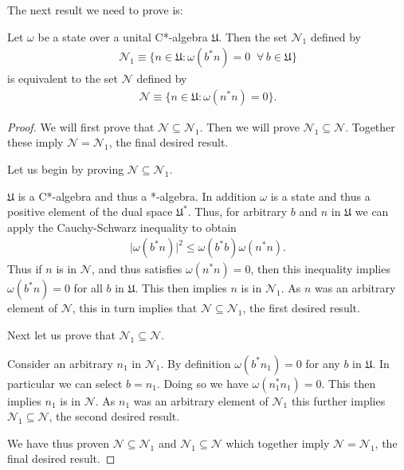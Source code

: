 The next result we need to prove is:

\begin{lemma}
    \label{lmm:lmm1}
    \leanok
    Let $\omega$ be a state over a unital C*-algebra $\mathfrak{U}$. Then the set $\mathcal{N}_1$ defined by
    \begin{align}
        \mathcal{N}_1 \equiv \{ n \in \mathfrak{U} : \omega(b^*n) = 0 \;\; \forall \, b \in \mathfrak{U} \}
    \end{align}
    is equivalent to the set $\mathcal{N}$ defined by
    \begin{align}
        \mathcal{N} \equiv \{ n \in \mathfrak{U} : \omega(n^*n) = 0 \}.
    \end{align}
\end{lemma}
\begin{proof}
We will first prove that $\mathcal{N} \subseteq \mathcal{N}_1$. Then we will prove $\mathcal{N}_1 \subseteq \mathcal{N}$. Together these imply $\mathcal{N} = \mathcal{N}_1$, the final desired result.

Let us begin by proving $\mathcal{N} \subseteq \mathcal{N}_1$.

$\mathfrak{U}$ is a C*-algebra and thus a *-algebra. In addition $\omega$ is a state and thus a positive element of the dual space $\mathfrak{U}^*$. Thus, for arbitrary $b$ and $n$ in $\mathfrak{U}$ we can apply the Cauchy-Schwarz inequality to obtain
\begin{align}
    \lvert \omega(b^*n) \rvert^2 \le \omega(b^*b) \omega(n^*n).
\end{align}
Thus if $n$ is in $\mathcal{N}$, and thus satisfies $\omega(n^*n) = 0$, then this inequality implies $\omega(b^*n) = 0$ for all $b$ in $\mathfrak{U}$. This then implies $n$ is in $\mathcal{N}_1$. As $n$ was an arbitrary element of $\mathcal{N}$, this in turn implies that $\mathcal{N} \subseteq \mathcal{N}_1$, the first desired result.

Next let us prove that $\mathcal{N}_1 \subseteq \mathcal{N}$.

Consider an arbitrary $n_1$ in $\mathcal{N}_1$. By definition $\omega(b^*n_1) = 0$ for any $b$ in $\mathfrak{U}$. In particular we can select $b=n_1$. Doing so we have $\omega(n_1^*n_1) = 0$. This then implies $n_1$ is in $\mathcal{N}$. As $n_1$ was an arbitrary element of $\mathcal{N}_1$ this further implies $\mathcal{N}_1 \subseteq \mathcal{N}$, the second desired result.

We have thus proven $\mathcal{N} \subseteq \mathcal{N}_1$ and $\mathcal{N}_1 \subseteq \mathcal{N}$ which together imply $\mathcal{N} = \mathcal{N}_1$, the final desired result.
\end{proof}

